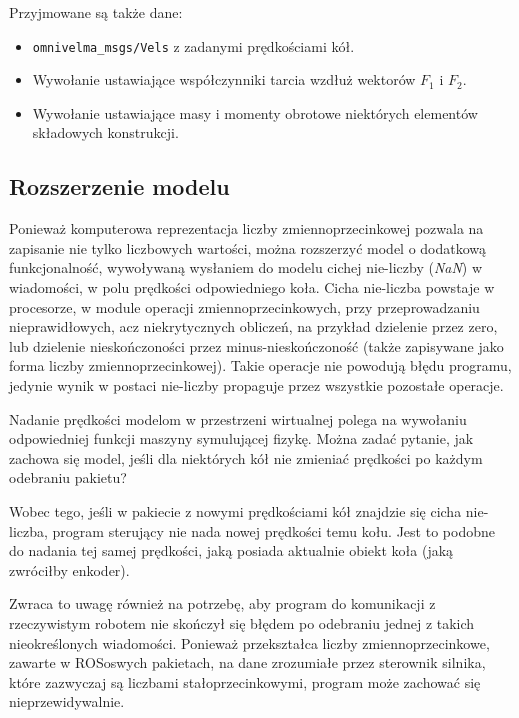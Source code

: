 		Przyjmowane są także dane:
		\begin{itemize}
		\item \texttt{omnivelma\_msgs/Vels} z zadanymi prędkościami kół.
		\item Wywołanie ustawiające współczynniki tarcia wzdłuż wektorów $F_1$ i $F_2$.
		\item Wywołanie ustawiające masy i momenty obrotowe niektórych elementów składowych konstrukcji.
		\end{itemize}

	\subsection{Rozszerzenie modelu}
		\label{sec:model_nan}
		Ponieważ komputerowa reprezentacja liczby zmiennoprzecinkowej pozwala na zapisanie nie tylko liczbowych wartości, można rozszerzyć model o dodatkową funkcjonalność,
		wywoływaną wysłaniem do modelu cichej nie-liczby (\emph{NaN}) w wiadomości, w polu prędkości odpowiedniego koła. 
		Cicha nie-liczba powstaje w procesorze, w module operacji zmiennoprzecinkowych, przy przeprowadzaniu nieprawidłowych, 
		acz niekrytycznych obliczeń, na przykład dzielenie przez zero, lub dzielenie nieskończoności przez minus-nieskończoność 
		(także zapisywane jako forma liczby zmiennoprzecinkowej).
		Takie operacje nie powodują błędu programu, jedynie wynik w postaci nie-liczby propaguje przez wszystkie pozostałe operacje.

		Nadanie prędkości modelom w przestrzeni wirtualnej polega na wywołaniu odpowiedniej funkcji maszyny symulującej fizykę.
		Można zadać pytanie, jak zachowa się model, jeśli dla niektórych kół nie zmieniać prędkości po każdym odebraniu pakietu?

		Wobec tego, jeśli w pakiecie z nowymi prędkościami kół znajdzie się cicha nie-liczba, program sterujący nie nada nowej prędkości temu kołu.
		Jest to podobne do nadania tej samej prędkości, jaką posiada aktualnie obiekt koła (jaką zwróciłby enkoder).

		Zwraca to uwagę również na potrzebę, aby program do komunikacji z rzeczywistym robotem nie skończył się błędem po odebraniu jednej z takich nieokreślonych wiadomości.
		Ponieważ przekształca liczby zmiennoprzecinkowe, zawarte w ROSoswych pakietach, na dane zrozumiałe przez sterownik silnika, które zazwyczaj są liczbami
		stałoprzecinkowymi, program może zachować się nieprzewidywalnie.
